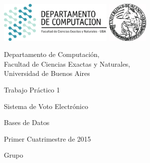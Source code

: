 \documentclass[a4paper, 10pt, twoside]{article}
\begin{document}




\thispagestyle{caratula}

\begin{center}

\includegraphics[height=2cm]{caratula/DC.png} 
\hfill
\includegraphics[height=2cm]{caratula/UBA.jpg} 

\vspace{2cm}

Departamento de Computación,\\
Facultad de Ciencias Exactas y Naturales,\\
Universidad de Buenos Aires

\vspace{4cm}

\begin{Huge}
Trabajo Práctico 1
\end{Huge}

\vspace{0.5cm}

\begin{huge}
Sistema de Voto Electrónico
\end{huge}

\vspace{0.5cm}

\begin{Large}
Bases de Datos
\end{Large}

\vspace{1cm}

Primer Cuatrimestre de 2015

\vspace{3.5cm}

\begin{Large}
Grupo
\end{Large}


\end{center}
\end{document}

